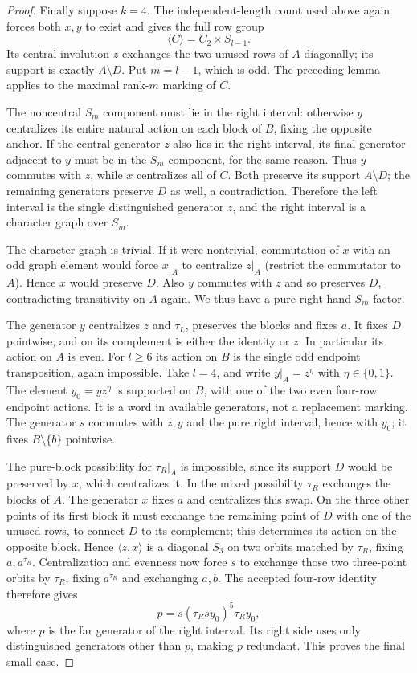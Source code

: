 \documentclass[11pt,a4paper]{article}
\newcommand{\gen}[1]{\langle#1\rangle}
\begin{document}
\begin{proof}
Finally suppose $k=4$. The independent-length count
used above again forces both $x,y$ to exist and gives
the full row group
\[
             \gen C=C_2\times S_{l-1}.
\]
Its central involution $z$ exchanges the two unused
rows of $A$ diagonally; its support is exactly
$A\setminus D$. Put $m=l-1$, which is odd. The
preceding lemma applies to the maximal rank-$m$
marking of $C$.

The noncentral $S_m$ component must lie in the right
interval: otherwise $y$ centralizes its entire natural
action on each block of $B$, fixing the opposite
anchor. If the central generator $z$ also lies in the
right interval, its final generator adjacent to $y$
must be in the $S_m$ component, for the same reason.
Thus $y$ commutes with $z$, while $x$ centralizes all
of $C$. Both preserve its support $A\setminus D$;
the remaining generators preserve $D$ as well, a
contradiction. Therefore the left interval is the
single distinguished generator $z$, and the right
interval is a character graph over $S_m$.

The character graph is trivial. If it were nontrivial,
commutation of $x$ with an odd graph element would
force $x|_A$ to centralize $z|_A$ (restrict the
commutator to $A$). Hence $x$ would preserve $D$.
Also $y$ commutes with $z$ and so preserves $D$,
contradicting transitivity on $A$ again.
We thus have a pure right-hand $S_m$ factor.

The generator $y$ centralizes $z$ and $\tau_L$,
preserves the blocks and fixes $a$. It fixes $D$
pointwise, and on its complement is either the
identity or $z$. In particular its action on $A$
is even. For $l\geq6$ its action on $B$ is the
single odd endpoint transposition, again impossible.
Take $l=4$, and write $y|_A=z^\eta$ with
$\eta\in\{0,1\}$. The element $y_0=yz^\eta$ is
supported on $B$, with one of the two even four-row
endpoint actions. It is a word in available generators,
not a replacement marking. The generator $s$ commutes
with $z,y$ and the pure right interval, hence with
$y_0$; it fixes $B\setminus\{b\}$ pointwise.

The pure-block possibility for $\tau_R|_A$ is
impossible, since its support $D$ would be preserved
by $x$, which centralizes it. In the mixed possibility
$\tau_R$ exchanges the blocks of $A$. The generator
$x$ fixes $a$ and centralizes this swap. On the
three other points of its first block it must exchange
the remaining point of $D$ with one of the unused
rows, to connect $D$ to its complement; this determines
its action on the opposite block. Hence $\gen{z,x}$
is a diagonal $S_3$ on two orbits matched by
$\tau_R$, fixing $a,a^{\tau_R}$.
Centralization and evenness now force $s$ to exchange
those two three-point orbits by $\tau_R$, fixing
$a^{\tau_R}$ and exchanging $a,b$. The accepted
four-row identity therefore gives
\[
                   p=s(\tau_R s y_0)^5\tau_R y_0,
\]
where $p$ is the far generator of the right interval.
Its right side uses only distinguished generators
other than $p$, making $p$ redundant. This proves
the final small case.
\end{proof}
\end{document}
